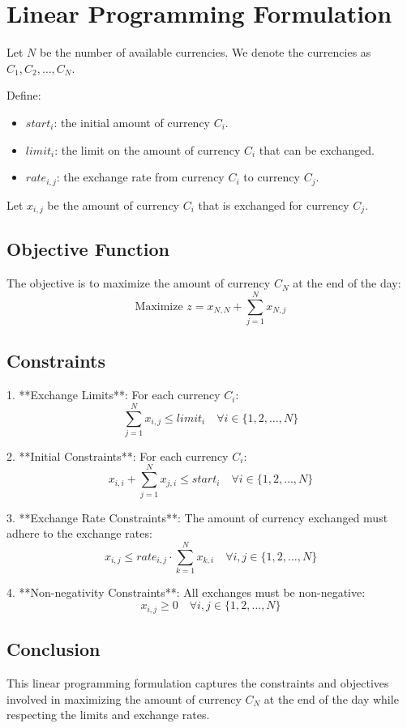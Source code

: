 \documentclass{article}
\begin{document}
\section*{Linear Programming Formulation}

Let \( N \) be the number of available currencies. We denote the currencies as \( C_1, C_2, \ldots, C_N \).

Define:
\begin{itemize}
    \item \( start_i \): the initial amount of currency \( C_i \).
    \item \( limit_i \): the limit on the amount of currency \( C_i \) that can be exchanged.
    \item \( rate_{i,j} \): the exchange rate from currency \( C_i \) to currency \( C_j \).
\end{itemize}

Let \( x_{i,j} \) be the amount of currency \( C_i \) that is exchanged for currency \( C_j \).

\subsection*{Objective Function}
The objective is to maximize the amount of currency \( C_N \) at the end of the day:
\[
\text{Maximize } z = x_{N,N} + \sum_{j=1}^{N} x_{N,j}
\]

\subsection*{Constraints}
1. **Exchange Limits**:
   For each currency \( C_i \):
   \[
   \sum_{j=1}^{N} x_{i,j} \leq limit_i \quad \forall i \in \{1, 2, \ldots, N\}
   \]

2. **Initial Constraints**:
   For each currency \( C_i \):
   \[
   x_{i,i} + \sum_{j=1}^{N} x_{j,i} \leq start_i \quad \forall i \in \{1, 2, \ldots, N\}
   \]

3. **Exchange Rate Constraints**:
   The amount of currency exchanged must adhere to the exchange rates:
   \[
   x_{i,j} \leq rate_{i,j} \cdot \sum_{k=1}^{N} x_{k,i} \quad \forall i,j \in \{1, 2, \ldots, N\}
   \]

4. **Non-negativity Constraints**:
   All exchanges must be non-negative:
   \[
   x_{i,j} \geq 0 \quad \forall i,j \in \{1, 2, \ldots, N\}
   \]

\subsection*{Conclusion}
This linear programming formulation captures the constraints and objectives involved in maximizing the amount of currency \( C_N \) at the end of the day while respecting the limits and exchange rates.
\end{document}
